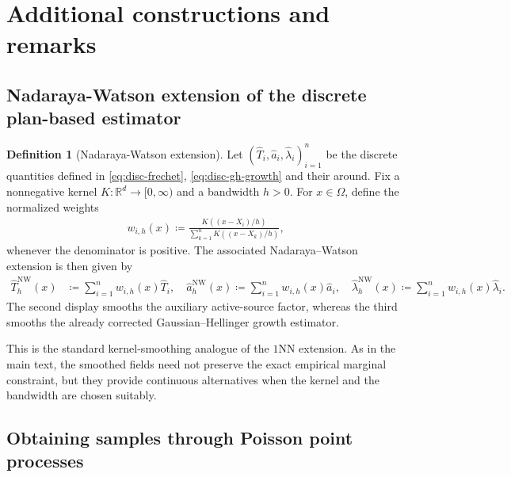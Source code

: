 \documentclass[11pt,reqno]{amsart}
\theoremstyle{definition}
\newtheorem{definition}{Definition}
\renewcommand{\hat}{\widehat}
\begin{document}
\section{Additional constructions and remarks}
\subsection{Nadaraya-Watson extension of the discrete plan-based estimator}
\label{sec:appendix_nw_extension}

\begin{definition}[Nadaraya-Watson extension]
\label{def:nw_extension_app}
Let $(\hat T_i,\hat a_i,\hat\lambda_i)_{i=1}^n$ be the discrete quantities defined in \eqref{eq:disc-frechet}, \eqref{eq:disc-gh-growth} and their around. Fix a nonnegative kernel $K:\mathbb R^d\to[0,\infty)$ and a bandwidth $h>0$. For $x\in\Omega$, define the normalized weights
\begin{align*}
    w_{i,h}(x)
    \coloneqq
    \frac{K \left((x-X_i)/h\right)}{\sum_{k=1}^n K \left((x-X_k)/h\right)},
\end{align*}
whenever the denominator is positive. The associated Nadaraya--Watson extension is then given by
\begin{align*}
    \hat T_h^{\mathrm{NW}}(x)
    &\coloneqq
    \sum_{i=1}^n w_{i,h}(x)\hat T_i, \quad 
    \hat a_h^{\mathrm{NW}}(x)
    \coloneqq
    \sum_{i=1}^n w_{i,h}(x)\hat a_i, \quad 
    \hat\lambda_h^{\mathrm{NW}}(x)
    \coloneqq
    \sum_{i=1}^n w_{i,h}(x)\hat\lambda_i.
\end{align*}
The second display smooths the auxiliary active-source factor, whereas the third smooths the already corrected Gaussian--Hellinger growth estimator.
\end{definition}
This is the standard kernel-smoothing analogue of the $1$NN extension. As in the main text, the smoothed fields need not preserve the exact empirical marginal constraint, but they provide continuous alternatives when the kernel and the bandwidth are chosen suitably.




\subsection{Obtaining samples through Poisson point processes}\label{sec:appendix_ppp}
\end{document}
